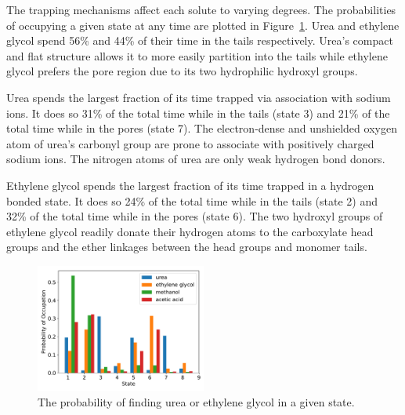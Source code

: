 \documentclass{article}
\begin{document}
  The trapping mechanisms affect each solute to varying degrees. The probabilities
  of occupying a given state at any time are plotted in Figure~\ref{fig:state_probabilities}.
  Urea and ethylene glycol spend 56\% and 44\% of their time in the tails
  respectively. Urea's compact and flat structure allows it to more easily 
  partition into the tails while ethylene glycol prefers the pore region due to 
  its two hydrophilic hydroxyl groups.
  
  Urea spends the largest fraction of its time trapped via association with sodium ions.
  It does so 31\% of the total time while in the tails (state 3) and 21\%
  of the total time while in the pores (state 7). The electron-dense and 
  unshielded oxygen atom of urea's carbonyl group are prone to associate 
  with positively charged sodium ions. The nitrogen atoms of urea are only
  weak hydrogen bond donors.
  
  Ethylene glycol spends the largest fraction of its time trapped in a hydrogen
  bonded state. It does so 24\% of the total time while in the tails (state 2)
  and 32\% of the total time while in the pores (state 6). The two hydroxyl groups 
  of ethylene glycol readily donate their hydrogen atoms to the carboxylate
  head groups and the ether linkages between the head groups and monomer tails. 
  
  \begin{figure}
  \centering
  \includegraphics[width=0.5\textwidth]{state_probabilities.pdf}
  \caption{The probability of finding urea or ethylene glycol in a given state.}\label{fig:state_probabilities}
  \end{figure}
  
  
  
\end{document}
